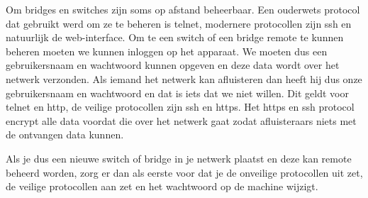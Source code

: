 Om bridges en switches zijn soms op afstand beheerbaar. Een ouderwets protocol dat gebruikt werd om ze te beheren is telnet, modernere protocollen zijn ssh en natuurlijk de web-interface. Om te een switch of een bridge remote te kunnen beheren moeten we kunnen inloggen op het apparaat. We moeten dus een gebruikersnaam en wachtwoord kunnen opgeven en deze data wordt over het netwerk verzonden. Als iemand het netwerk kan afluisteren dan heeft hij dus onze gebruikersnaam en wachtwoord en dat is iets dat we niet willen. Dit geldt voor telnet en http, de veilige protocollen zijn ssh en https. Het https en ssh protocol encrypt alle data voordat die over het netwerk gaat zodat afluisteraars niets met de ontvangen data kunnen.

Als je dus een nieuwe switch of bridge in je netwerk plaatst en deze kan remote beheerd worden, zorg er dan als eerste voor dat je de onveilige protocollen uit zet, de veilige protocollen aan zet en het wachtwoord op de machine wijzigt.
